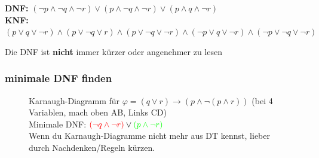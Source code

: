 \documentclass[
    ngerman,
    color=3b,
    summary,
    boxarc,
    main,
    fleqn,
    leqno,
]{rubos-tuda-template}
\begin{document}
    \textcolor{dnfcolor}{\textbf{DNF:}} $(\lnot p\land \lnot q\land \lnot r)\lor(p\land \lnot q\land \lnot r)\lor(p\land q\land\lnot r)$\\
    \textcolor{knfcolor}{\textbf{KNF:}} $(p\lor q\lor\lnot r)\land(p\lor \lnot q\lor r)\land(p\lor \lnot q\lor \lnot r)\land(\lnot p\lor q\lor \lnot r)\land(\lnot p\lor \lnot q\lor \lnot r)$
    \begin{anmerkung}
        Die DNF ist \textbf{nicht} immer kürzer oder angenehmer zu lesen
    \end{anmerkung}
    \vspace{-2cm}\vspace{\fill}
    \subsubsection{minimale DNF finden}%
    \vspace{-1.5em}%
    \begin{figure}[ht!]%
        \centering%
        \begin{cartonaugh}[4][2][1][$qr$][$p$]
            \autoterms[0]
        \end{cartonaugh}
        \caption{
            Karnaugh-Diagramm für $\varphi=(q\lor r)\rightarrow(p\land\lnot (p\land r))$ (bei 4 Variablen, mach oben AB, Links CD)\\
            Minimale DNF: $\textcolor{red}{\left(\lnot q\land \lnot r\right)}\lor\textcolor{green}{\left(p\land \lnot r\right)}$\\
             Wenn du Karnaugh-Diagramme nicht mehr aus DT kennst, lieber durch Nachdenken/Regeln kürzen.
        }
    \end{figure}
    \clearpage
\end{document}
